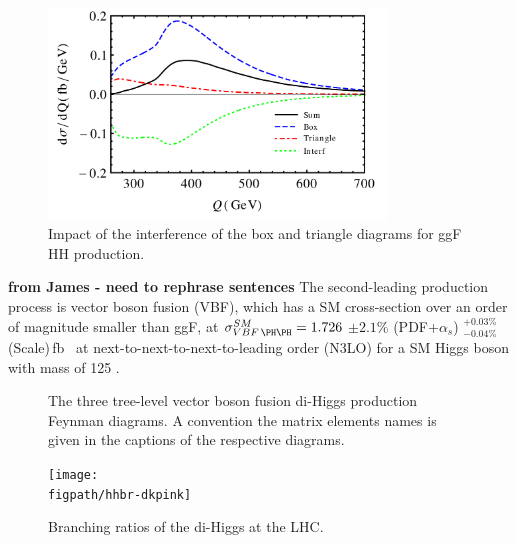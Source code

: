 \begin{figure}[h]
    \centering
    \includegraphics[width=0.8\textwidth]{figures/my_dihiggs/box_triangle_diagram.pdf}
    \caption{Impact of the interference of the box and triangle diagrams for ggF HH production.}
    \label{fig:box-tri}
\end{figure}


\textbf{from James - need to rephrase sentences}
The second-leading \HH production process is vector boson fusion (VBF), which has a SM cross-section over an order of magnitude smaller than ggF, at $\sigma_{VBF\,\HH}^{SM} = 1.726$ $\pm 2.1\%$ (PDF+$\alpha_{s}$) $^{+0.03\%}_{-0.04\%}$(Scale)\,fb~\cite{Dreyer_2018} at next-to-next-to-next-to-leading order (N3LO) for a SM Higgs boson with mass of 125 \GeV. 

\begin{figure}[t]
    \centering
    \caption{The three tree-level vector boson fusion di-Higgs production Feynman diagrams. A convention the matrix elements names is given in the captions of the respective diagrams.}
    \label{fig:VBF_feyn_dias}
\end{figure}

\begin{figure}
    \centering
    \texttt{[image: \\figpath/hhbr-dkpink]}
    \caption{Branching ratios of the di-Higgs at the LHC.}
    \label{fig:branching-ratios}
\end{figure}

